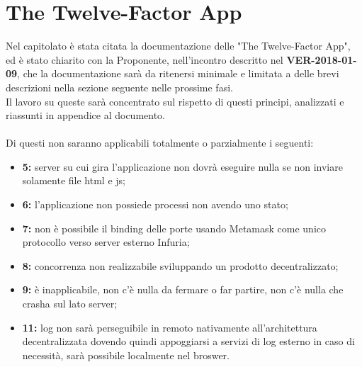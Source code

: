 \documentclass[PianoDiQualifica.tex]{subfiles}
\begin{document}
\section{The Twelve-Factor App}
Nel capitolato è stata citata la documentazione delle "The Twelve-Factor App", ed è stato chiarito con la Proponente, nell'incontro descritto nel \textbf{VER-2018-01-09}, che la documentazione sarà da ritenersi minimale e limitata a delle brevi descrizioni nella sezione seguente nelle prossime fasi.\\
Il lavoro su queste sarà concentrato sul rispetto di questi principi, analizzati e riassunti in appendice al documento.\\\\
Di questi non saranno applicabili totalmente o parzialmente i seguenti:
\begin{itemize}
	\item \textbf{5:} server su cui gira l'applicazione non dovrà eseguire nulla se non inviare solamente file html e js;
	\item \textbf{6:} l'applicazione non possiede processi non avendo uno stato;
	\item \textbf{7:} non è possibile il binding delle porte usando Metamask come unico protocollo verso server esterno Infuria;
	\item \textbf{8:} concorrenza non realizzabile sviluppando un prodotto decentralizzato;
	\item \textbf{9:} è inapplicabile, non c'è nulla da fermare o far partire, non c'è nulla che crasha sul lato server;
	\item \textbf{11:} log non sarà perseguibile in remoto nativamente all'architettura decentralizzata dovendo quindi appoggiarsi a servizi di log esterno in caso di necessità, sarà possibile localmente nel broswer.
\end{itemize}
\end{document}
